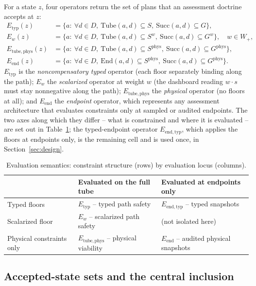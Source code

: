 \documentclass[preprint,11pt,authoryear]{elsarticle}
\theoremstyle{definition}
\theoremstyle{remark}
\newcommand{\Etyp}{E_{\mathrm{typ}}}
\newcommand{\Eend}{E_{\mathrm{end}}}
\newcommand{\Ephys}{E_{\mathrm{tube,phys}}}
\newcommand{\Wp}{W_+}
\newcommand{\Tube}{\mathrm{Tube}}
\newcommand{\Succ}{\mathrm{Succ}}
\newcommand{\End}{\mathrm{End}}
\begin{document}
For a state $z$, four operators return the set of plans that an assessment doctrine accepts at $z$:
\begin{align}
\Etyp(z)&=\{a:\ \forall d\in D,\ \Tube(a,d)\subseteq S,\ \Succ(a,d)\subseteq G\}, \label{eq:Etyp}\\
E_w(z)&=\{a:\ \forall d\in D,\ \Tube(a,d)\subseteq S^w,\ \Succ(a,d)\subseteq G^w\},\quad w\in\Wp, \label{eq:Ew}\\
\Ephys(z)&=\{a:\ \forall d\in D,\ \Tube(a,d)\subseteq S^{\mathrm{phys}},\ \Succ(a,d)\subseteq G^{\mathrm{phys}}\}, \label{eq:Ephys}\\
\Eend(z)&=\{a:\ \forall d\in D,\ \End(a,d)\subseteq S^{\mathrm{phys}},\ \Succ(a,d)\subseteq G^{\mathrm{phys}}\}. \label{eq:Eend}
\end{align}
$\Etyp$ is the \emph{noncompensatory typed} operator (each floor separately binding along the path); $E_w$ the \emph{scalarized} operator at weight $w$ (the dashboard reading $w\cdot s$ must stay nonnegative along the path); $\Ephys$ the \emph{physical} operator (no floors at all); and $\Eend$ the \emph{endpoint} operator, which represents any assessment architecture that evaluates constraints only at sampled or audited endpoints. The two axes along which they differ -- what is constrained and where it is evaluated -- are set out in Table~\ref{tab:semantics}; the typed-endpoint operator $E_{\mathrm{end,typ}}$, which applies the floors at endpoints only, is the remaining cell and is used once, in Section~\ref{sec:design}.

\begin{table}[!htbp]
\centering\small
\caption{Evaluation semantics: constraint structure (rows) by evaluation locus (columns).}
\label{tab:semantics}
\begin{tabularx}{\textwidth}{@{}>{\raggedright\arraybackslash}p{}XX@{}}
\toprule
 & Evaluated on the full tube & Evaluated at endpoints only \\
\midrule
Typed floors & $\Etyp$ -- typed path safety & $E_{\mathrm{end,typ}}$ -- typed snapshots \\
Scalarized floor & $E_w$ -- scalarized path safety & (not isolated here) \\
Physical constraints only & $\Ephys$ -- physical viability & $\Eend$ -- audited physical snapshots \\
\bottomrule
\end{tabularx}
\end{table}

\subsection{Accepted-state sets and the central inclusion}
\end{document}
